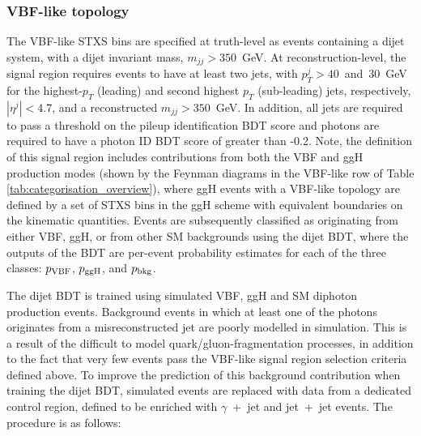 \subsubsection{VBF-like topology}
The VBF-like STXS bins are specified at truth-level as events containing a dijet system, with a dijet invariant mass, $m_{jj}>350$~GeV. At reconstruction-level, the signal region requires events to have at least two jets, with $p_T^{j}>40$~and~$30$~GeV for the highest-$p_T$ (leading) and second highest $p_T$ (sub-leading) jets, respectively, $|\eta^j|<4.7$, and a reconstructed $m_{jj}>350$~GeV. In addition, all jets are required to pass a threshold on the pileup identification BDT score and photons are required to have a photon ID BDT score of greater than -0.2. Note, the definition of this signal region includes contributions from both the VBF and ggH production modes (shown by the Feynman diagrams in the VBF-like row of Table \ref{tab:categorisation_overview}), where ggH events with a VBF-like topology are defined by a set of STXS bins in the ggH scheme with equivalent boundaries on the kinematic quantities. Events are subsequently classified as originating from either VBF, ggH, or from other SM backgrounds using the dijet BDT, where the outputs of the BDT are per-event probability estimates for each of the three classes: $p_{\rm{VBF}}$, $p_{\rm{ggH}}$, and $p_{\rm{bkg}}$.

The dijet BDT is trained using simulated VBF, ggH and SM diphoton production events. Background events in which at least one of the photons originates from a misreconstructed jet are poorly modelled in simulation. This is a result of the difficult to model quark/gluon-fragmentation processes, in addition to the fact that very few events pass the VBF-like signal region selection criteria defined above. To improve the prediction of this background contribution when training the dijet BDT, simulated events are replaced with data from a dedicated control region, defined to be enriched with $\gamma$~+~jet and jet~+~jet events. The procedure is as follows:

